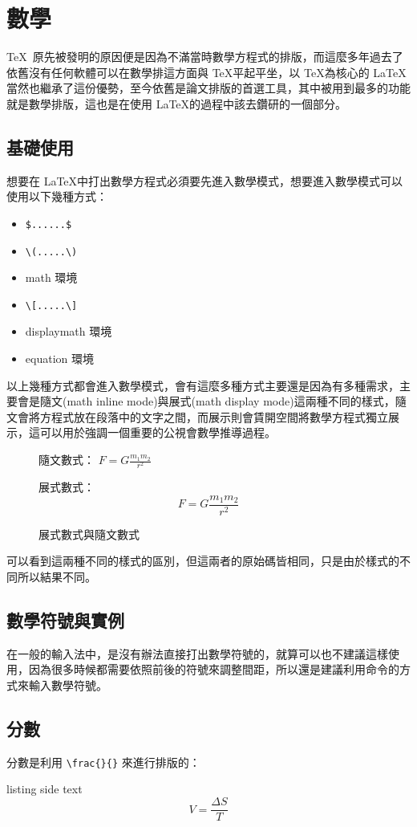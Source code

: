 \chapter{數學}

\TeX\ 原先被發明的原因便是因為不滿當時數學方程式的排版，而這麼多年過去了依舊沒有任何軟體可以在數學排這方面與 \TeX 平起平坐，以 \TeX 為核心的 \LaTeX 當然也繼承了這份優勢，至今依舊是論文排版的首選工具，其中被用到最多的功能就是數學排版，這也是在使用 \LaTeX 的過程中該去鑽研的一個部分。

\section{基礎使用}

想要在 \LaTeX 中打出數學方程式必須要先進入數學模式，想要進入數學模式可以使用以下幾種方式：

\begin{itemize}
\item \verb|$......$| 
\item \verb|\(.....\)|
\item math 環境
\item \verb|\[.....\]|
\item displaymath 環境
\item equation 環境
\end{itemize}

以上幾種方式都會進入數學模式，會有這麼多種方式主要還是因為有多種需求，主要會是隨文(math inline mode)與展式(math display mode)這兩種不同的樣式，隨文會將方程式放在段落中的文字之間，而展示則會賃開空間將數學方程式獨立展示，這可以用於強調一個重要的公視會數學推導過程。

\begin{figure}[htp]
\begin{minipage}{0.5\textwidth}
隨文數式：
\( F = G\frac{m_1m_2}{r^2}\)
\end{minipage}
\begin{minipage}{0.5\textwidth}
展式數式：
\[ F = G\frac{m_1m_2}{r^2}\]
\end{minipage}
\caption{展式數式與隨文數式}
\end{figure}


可以看到這兩種不同的樣式的區別，但這兩者的原始碼皆相同，只是由於樣式的不同所以結果不同。

\section{數學符號與實例}

在一般的輸入法中，是沒有辦法直接打出數學符號的，就算可以也不建議這樣使用，因為很多時候都需要依照前後的符號來調整間距，所以還是建議利用命令的方式來輸入數學符號。

\section{分數}

分數是利用 \verb|\frac{}{}| 來進行排版的：

\begin{tcblisting}{listing side text}
\[
V = \frac{\Delta S}{T}
\]
\end{tcblisting}

